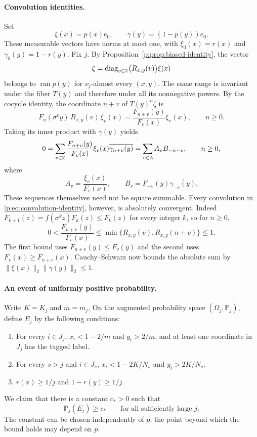 \paragraph{Convolution identities.}
Set
\[
 \xi(x)=p(x)e_0,\qquad \gamma(y)=(1-p(y))e_0.
\]
These measurable vectors have norms at most one, with
$\xi_0(x)=r(x)$ and $\gamma_0(y)=1-r(y)$.  Fix $j$.  By
Proposition~\ref{p:prop:biased-identity}, the vector
\[
 \zeta=\operatorname{diag}_{v\in\mathbb Z}\bigl(R_{x,y}(v)\bigr)\xi(x)
\]
belongs to $\operatorname{ran}p(y)$ for $\nu_j$-almost every
$(x,y)$.  The same range is invariant under the fiber $T(y)$ and
therefore under all its nonnegative powers.  By the cocycle identity,
the coordinate $n+v$ of $T(y)^n\zeta$ is
\[
 F_n(\sigma^v y)\,R_{x,y}(v)\,\xi_v(x)
 =\frac{F_{n+v}(y)}{F_v(x)}\xi_v(x),\qquad n\ge0.
\]
Taking its inner product with $\gamma(y)$ yields
\begin{equation}\label{p:eq:convolution-identity}
 0=\sum_{v\in\mathbb Z}\frac{F_{n+v}(y)}{F_v(x)}
                  \xi_v(x)\overline{\gamma_{n+v}(y)}
   =\sum_{v\in\mathbb Z}A_vB_{-n-v},\qquad n\ge0,
\end{equation}
where
\begin{equation}\label{p:eq:coefficient-sequences}
 A_v=\frac{\xi_v(x)}{F_v(x)},\qquad
 B_v=F_{-v}(y)\overline{\gamma_{-v}(y)}.
\end{equation}
These sequences themselves need not be square summable.  Every
convolution in \eqref{p:eq:convolution-identity}, however, is absolutely
convergent.  Indeed $F_{k+1}(z)=f(\sigma^k z)F_k(z)\le F_k(z)$
for every integer $k$, so for $n\ge0$,
\begin{equation}\label{p:eq:two-ratio-bounds}
 0<\frac{F_{n+v}(y)}{F_v(x)}
 \le\min\{R_{x,y}(v),R_{x,y}(n+v)\}\le1.
\end{equation}
The first bound uses $F_{n+v}(y)\le F_v(y)$ and the second uses
$F_v(x)\ge F_{n+v}(x)$.  Cauchy--Schwarz now bounds the absolute
sum by $\|\xi(x)\|_2\|\gamma(y)\|_2\le1$.

\paragraph{An event of uniformly positive probability.}
Write $K=K_j$ and $m=m_j$.  On the augmented probability space
$(\Omega_j,\mathbb P_j)$, define $E_j$ by the following conditions:
\begin{enumerate}
 \item For every $i\in J_j$,
 $x_i<1-2/m$ and $y_i>2/m$, and at least one coordinate in $J_j$
 has the tagged label.
 \item For every $s>j$ and $i\in J_s$,
 $x_i<1-2K/N_s$ and $y_i>2K/N_s$.
 \item $r(x)\ge1/j$ and $1-r(y)\ge1/j$.
\end{enumerate}
We claim that there is a constant $c_*>0$ such that
\begin{equation}\label{p:eq:positive-event}
 \mathbb P_j(E_j)\ge c_*
 \qquad\text{for all sufficiently large }j.
\end{equation}
The constant can be chosen independently of $p$; the point beyond
which the bound holds may depend on $p$.

